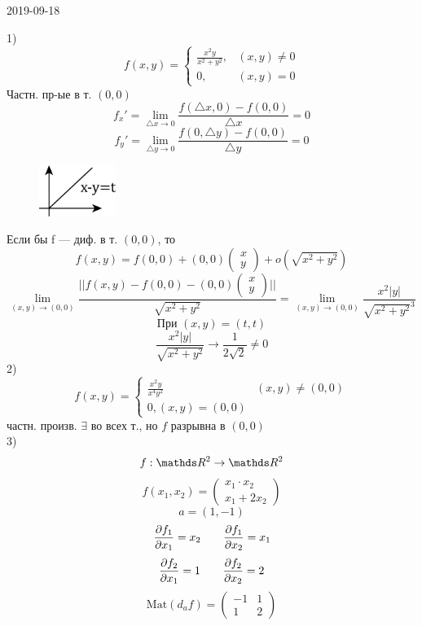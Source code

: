 \documentclass[main]{subfiles}
\begin{document}
\begin{lect} {2019-09-18}
	\begin{example}
		1)
		\[f(x, y) = \begin{cases}
				\frac{x^2 y}{x^2 + y^2}, & (x, y) \neq 0 \\
				0,                       & (x, y) = 0
			\end{cases}\]
		Частн. пр-ые в т. $(0, 0)$
		\[f_x' = \lim_{\triangle x \to 0} \frac{f(\triangle x, 0) - f(0, 0)}{\triangle x} = 0 \]
		\[f_y' = \lim_{\triangle y \to 0} \frac{f(0, \triangle y) - f(0, 0)}{\triangle y} = 0\]
		\begin{figure}[H]
			\includegraphics[width = 2.5cm]{pics/4_1}
			\centering
		\end{figure}
		Если бы f --- диф. в т. $(0, 0)$, то
		\[f(x, y) = f(0, 0) + (0, 0) \begin{pmatrix}
				x \\
				y
			\end{pmatrix}
			+ o(\sqrt{x^2 + y^2})
		\]
		\[\lim_{(x, y) \to (0, 0)} \frac{||f(x, y) - f(0, 0) - (0, 0) \begin{pmatrix}
					x \\
					y
				\end{pmatrix}||}{\sqrt{x^2 + y^2}} =
			\lim_{(x, y) \to (0, 0)} \frac{x^2|y|}{ \sqrt{x^2 + y^2}^3} \]
		\[\text{При } (x, y) = (t, t)\]
		\[\frac{x^2|y|}{\sqrt{x^2 + y^2}} \to \frac{1}{2\sqrt{2}} \neq 0\]
		2)
		\[f(x, y) = \begin{cases}
				\frac{x^2 y}{x^4 y^2} & (x, y) \neq (0, 0) \\
				0 , (x, y) = (0, 0)
			\end{cases}\]
		частн. произв. $\exists$ во всех т., но $f$ разрывна в $(0, 0)$\\
		3)
		\[f: \R^2 \to \R^2\]
		\[f(x_1, x_2) = \begin{pmatrix}
				x_1 \cdot x_2 \\
				x_1 + 2x_2
			\end{pmatrix}\]
		\[a = (1, -1)\]
		\[\frac{\partial f_1}{\partial x_1} = x_2 \quad\quad \frac{\partial f_1}{\partial x_2} = x_1\]
		\[\frac{\partial f_2}{\partial x_1} = 1 \quad\quad \frac{\partial f_2}{\partial x_2} = 2\]
		\[\text{Mat}(d_a f) = \begin{pmatrix}
				-1 & 1 \\
				1  & 2
			\end{pmatrix}\]

\end{example}
\end{lect}
\end{document}
